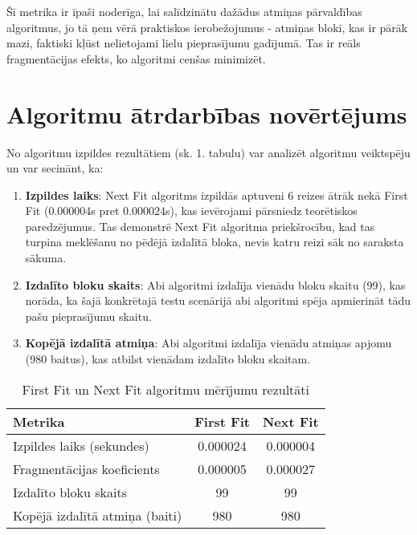 \documentclass{report}
\begin{document}
	Šī metrika ir īpaši noderīga, lai salīdzinātu dažādus atmiņas pārvaldības algoritmus, jo tā ņem vērā praktiskos ierobežojumus - atmiņas bloki, kas ir pārāk mazi, faktiski kļūst nelietojami lielu pieprasījumu gadījumā. Tas ir reāls fragmentācijas efekts, ko algoritmi cenšas minimizēt.
	
	\section{Algoritmu ātrdarbības novērtējums}
		
	No algoritmu izpildes rezultātiem (sk. 1. tabulu) var analizēt algoritmu veiktspēju un var secinānt, ka:
	
	\begin{enumerate}
		\item \textbf{Izpildes laiks}: Next Fit algoritms izpildās aptuveni 6 reizes ātrāk nekā First Fit (0.000004s pret 0.000024s), kas ievērojami pārsniedz teorētiskos paredzējumus. Tas demonstrē Next Fit algoritma priekšrocību, kad tas turpina meklēšanu no pēdējā izdalītā bloka, nevis katru reizi sāk no saraksta sākuma.
		
		\item \textbf{Izdalīto bloku skaits}: Abi algoritmi izdalīja vienādu bloku skaitu (99), kas norāda, ka šajā konkrētajā testu scenārijā abi algoritmi spēja apmierināt tādu pašu pieprasījumu skaitu.
		
		\item \textbf{Kopējā izdalītā atmiņa}: Abi algoritmi izdalīja vienādu atmiņas apjomu (980 baitus), kas atbilst vienādam izdalīto bloku skaitam.
	\end{enumerate}
	
	\begin{table}[h]
		\centering
		\begin{tabular}{lcc}
			\toprule
			\textbf{Metrika} & \textbf{First Fit} & \textbf{Next Fit} \\
			\midrule
			Izpildes laiks (sekundes) & 0.000024 & 0.000004 \\
			Fragmentācijas koeficients & 0.000005 & 0.000027 \\
			Izdalīto bloku skaits & 99 & 99 \\
			Kopējā izdalītā atmiņa (baiti) & 980 & 980 \\
			\bottomrule
		\end{tabular}
		\caption{First Fit un Next Fit algoritmu mērījumu rezultāti}
		\label{tab:performance}
	\end{table}
	
\end{document}
